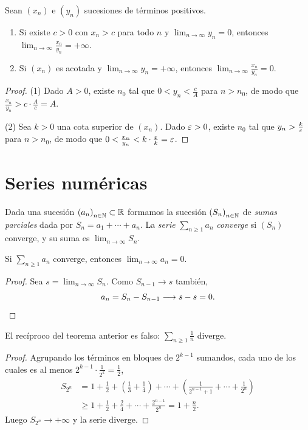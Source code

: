 \begin{prop}
  Sean \({(x_n)}\) e \({(y_n)}\) sucesiones de términos positivos.
  \begin{enumerate}[label=(\arabic*)]
    \item Si existe \(c > 0\) con \(x_n > c\) para todo \(n\) y \(\lim_{n \to \infty} y_n = 0\), entonces \(\lim_{n \to \infty} \frac{x_n}{y_n} = +\infty\).
    \item Si \({(x_n)}\) es acotada y \(\lim_{n \to \infty} y_n = +\infty\), entonces \(\lim_{n \to \infty} \frac{x_n}{y_n} = 0\).
  \end{enumerate}
\end{prop}

\begin{proof}
  (1) Dado \(A > 0\), existe \(n_0\) tal que \(0 < y_n < \frac{c}{A}\) para \(n > n_0\), de modo que \(\frac{x_n}{y_n} > c \cdot \frac{A}{c} = A\).

  (2) Sea \(k > 0\) una cota superior de \({(x_n)}\). Dado \(\varepsilon > 0\), existe \(n_0\) tal que \(y_n > \frac{k}{\varepsilon}\) para \(n > n_0\), de modo que \(0 < \frac{x_n}{y_n} < k \cdot \frac{\varepsilon}{k} = \varepsilon\).
\end{proof}

\section{Series numéricas}

Dada una sucesión \({(a_n)}_{n \in \mathbb{N}} \subset \mathbb{R}\) formamos la sucesión \({(S_n)}_{n \in \mathbb{N}}\) de \emph{sumas parciales} dada por \(S_n = a_1 + \cdots + a_n\). La \emph{serie} \(\sum_{n \geq 1} a_n\) \emph{converge} si \({(S_n)}\) converge, y su suma es \(\lim_{n \to \infty} S_n\).

\begin{theorem}
  Si \(\sum_{n \geq 1} a_n\) converge, entonces \(\lim_{n \to \infty} a_n = 0\).
\end{theorem}

\begin{proof}
  Sea \(s = \lim_{n \to \infty} S_n\). Como \(S_{n-1} \to s\) también,
  \[
    a_n = S_n - S_{n-1} \longrightarrow s - s = 0. \qedhere
  \]
\end{proof}

\begin{eg}
  El recíproco del teorema anterior es falso: \(\sum_{n \geq 1} \frac{1}{n}\) diverge.
\end{eg}

\begin{proof}
  Agrupando los términos en bloques de \(2^{k-1}\) sumandos, cada uno de los cuales es al menos \(2^{k-1} \cdot \frac{1}{2^k} = \frac{1}{2}\),
  \begin{align*}
    S_{2^n} & = 1 + \frac{1}{2} + \left( \frac{1}{3} + \frac{1}{4} \right) + \cdots + \left( \frac{1}{2^{n-1} + 1} + \cdots + \frac{1}{2^n} \right) \\
            & \geq 1 + \frac{1}{2} + \frac{2}{4} + \cdots + \frac{2^{n-1}}{2^n} = 1 + \frac{n}{2}.
  \end{align*}
  Luego \(S_{2^n} \to +\infty\) y la serie diverge.
\end{proof}

